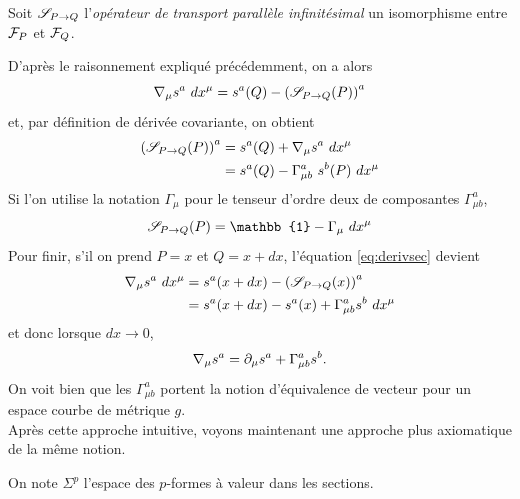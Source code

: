 \documentclass[a4paper,11pt]{report}
\begin{document}
                 \begin{defn}
                    Soit $\S_{P\to Q}$ l'\textit{opérateur de transport parallèle infinitésimal} un isomorphisme entre $\F_P$ et $\F_Q$.
                 \end{defn}
                 
                 D'après le raisonnement expliqué précédemment, on a alors
                 \begin{equation}\label{eq:derivsec}
                     \nabla_\mu s^a~dx^\mu = s^a(Q)-\left(\S_{P\to Q}(P)\right)^a
                 \end{equation}
                 et, par définition de dérivée covariante, on obtient
                 \begin{align}
                     \left(\S_{P\to Q}(P)\right)^a &= s^a(Q) + \nabla_\mu s^a~dx^\mu\\
                     &= s^a(Q) - \Gamma^a_{\mu b}~ s^b(P) ~dx^\mu
                 \end{align}
                 Si l'on utilise la notation $\Gamma_\mu$ pour le tenseur d'ordre deux de composantes $\Gamma^a_{\mu b}$, 
                 \begin{equation}
                     \S_{P\to Q}(P) = \mathbb{1} - \Gamma_\mu~dx^\mu
                 \end{equation}
                 Pour finir, s'il on prend $P = x$ et $Q = x+dx$, l'équation \ref{eq:derivsec} devient
                 \begin{align}
                      \nabla_\mu s^a~dx^\mu &= s^a(x+dx)-\left(\S_{P\to Q}(x)\right)^a\\
                      &= s^a(x+dx)-s^a(x)+\Gamma^a_{\mu b}s^b~dx^\mu
                 \end{align}
                 et donc lorsque $dx\to0$,
                 \begin{equation}
                     \nabla_\mu s^a = \p_\mu s^a+\Gamma^a_{\mu b}s^b.
                 \end{equation}
                 On voit bien que les $\Gamma^a_{\mu b}$ portent la notion d'équivalence de vecteur pour un espace courbe de métrique $g$. \\
                 
                 Après cette approche intuitive, voyons maintenant une approche plus axiomatique de la même notion.
                 
                 \begin{defn}
                    On note $\Sigma^p$ l'espace des $p$-formes à valeur dans les sections.
                 \end{defn}
                 
\end{document}
